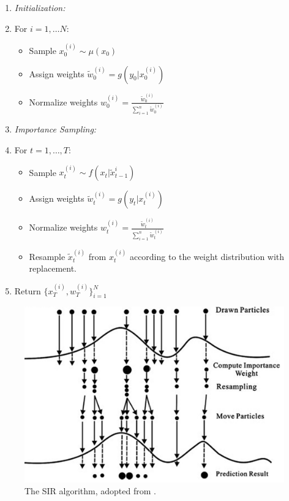 \documentclass{article}
\begin{document}
\begin{enumerate}
\item \textit{Initialization:}
\item[] For $i=1,\dots N$:
\begin{itemize}
\item[] Sample $x_0^{(i)} \sim \mu(x_0)$
\item[] Assign weights $\widetilde{w}_0^{(i)} = g(y_0|x_0^{(i)})$
\item[] Normalize weights $w_0^{(i)} = \frac{\widetilde{w}_0^{(i)}}{\sum_{i=1}^{n} \widetilde{w}_0^{(i)}}$
\end{itemize}
\item \textit{Importance Sampling:}
\item[] For $t=1,\dots,T$:
\begin{itemize}
\item[] Sample $x_t^{(i)} \sim f(x_t|\widetilde{x}_{t-1}^{i})$
\item[] Assign weights $\widetilde{w}_t^{(i)} = g(y_t|x_t^{(i)})$
\item[] Normalize weights $w_t^{(i)} = \frac{\widetilde{w}_t^{(i)}}{\sum_{i=1}^{n} \widetilde{w}_t^{(i)}}$
\item[] Resample $\widetilde{x}_t^{(i)}$ from $x_t^{(i)}$ according to the weight distribution with replacement.
\end{itemize}
\item Return $\{x_T^{(i)},w_T^{(i)}\}_{i=1}^N$
\end{enumerate}

\begin{figure}
\centering
\includegraphics[scale=.25]{sir}
\caption{The SIR algorithm, adopted from \cite{sirfig}.}
\label{fig:sir}
\end{figure}
\end{document}
